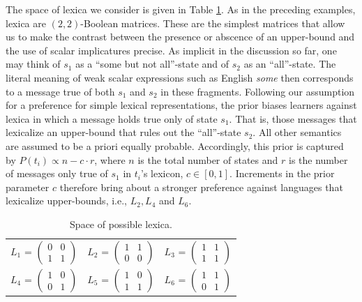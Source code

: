 \documentclass[a4paper]{article}
\begin{document}
The space of lexica we consider is given in Table \ref{tab:lexica}. As in the preceding examples, lexica are $(2,2)$-Boolean matrices. These are the simplest matrices that allow us to make the contrast between the presence or abscence of an upper-bound and the use of scalar implicatures precise. As implicit in the discussion so far, one may think of $s_1$ as a ``some but not all''-state and of $s_2$ as an ``all''-state. The literal meaning of weak scalar expressions such as English {\em some} then corresponds to a message true of both $s_1$ and $s_2$ in these fragments. Following our assumption for a preference for simple lexical representations, the prior biases learners against lexica in which a message holds true only of state $s_1$. That is, those messages that lexicalize an upper-bound that rules out the ``all''-state $s_2$. All other semantics are assumed to be a priori equally probable. Accordingly, this prior is captured by $P(t_i) \propto n - c \cdot r$, where $n$ is the total number of states and $r$ is the number of messages only true of $s_1$ in $t_i$'s lexicon, $c \in [0,1]$. Increments in the prior parameter $c$ therefore bring about a stronger preference against languages that lexicalize upper-bounds, i.e., $L_2, L_4$ and $L_6$.

\begin{table}[t]
\centering 
\begin{tabular}{l c l}
$L_1$ = $\begin{pmatrix} 0 & 0 \\ 1 & 1 \end{pmatrix}$ & 
$L_2$ = $\begin{pmatrix} 1 & 1 \\ 0 & 0 \end{pmatrix}$ & 
$L_3$ = $\begin{pmatrix} 1 & 1 \\ 1 & 1 \end{pmatrix}$\\[0.5cm]

$L_4$ = $\begin{pmatrix} 1 & 0 \\ 0 & 1 \end{pmatrix}$ &
$L_5$ = $\begin{pmatrix} 1 & 0 \\ 1 & 1 \end{pmatrix}$ &
$L_6$ = $\begin{pmatrix} 1 & 1 \\ 0 & 1 \end{pmatrix}$
\end{tabular}
\caption{Space of possible lexica.}
\label{tab:lexica}
\end{table}
\end{document}
